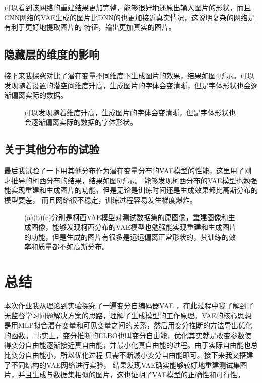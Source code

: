 \documentclass[UTF8]{ctexart}
\begin{document}
可以看到该网络的重建结果更加完整，能够很好地还原出输入图片的形状，而且CNN网络的VAE生成的图片比DNN的也更加接近真实情况，这说明复杂的网络是有利于更好地提取图片的
特征，输出更加真实的图片。
\subsection{隐藏层的维度的影响}
接下来我探究对比了潜在变量不同维度下生成图片的效果，结果如图4所示。可以发现随着设置的潜空间维度升高，生成图片的字体会变清晰，但是字体形状也会逐渐偏离实际的数据。
\begin{figure}[ht]
  \centering
  \quad
  \quad
  \quad
  \quad
  \quad
  \caption{可以发现随着维度升高，生成图片的字体会变清晰，但是字体形状也会逐渐偏离实际的数据的字体形状。}
\end{figure}
\subsection{关于其他分布的试验}
最后我试验了一下用其他分布作为潜在变量分布的VAE模型的性能，这里用了刚才推导的柯西分布的结果，结果如图5所示。
能够发现柯西分布的VAE模型也勉强能实现重建和生成图片的功能，但是无论是训练时间还是生成效果都比高斯分布的模型要差，
而且网络很不稳定，训练过程容易发生梯度爆炸。
\begin{figure}[h!]
  \centering
  \quad
  \quad
  \caption{(a)(b)(c)分别是柯西VAE模型对测试数据集的原图像，重建图像和生成图像，能够发现柯西分布的VAE模型也勉强能实现重建和生成图片的功能，但是生成的图片有很多是远远偏离正常形状的，其训练的效率和质量都不如高斯分布。}
\end{figure}
\section{总结}
本次作业我从理论到实验探究了一遍变分自编码器VAE
，在此过程中我了解到了无监督学习问题解决方案的思路，理解了生成模型的工作原理。VAE的核心思想是用MLP拟合潜在变量和可见变量之间的关系，然后用变分推断的方法导出优化的函数。
事实上，变分推断的ELBO也叫变分自由能，优化其实就是改变参数使得变分自由能逐渐接近真自由能，并最小化真自由能的过程。由于实际自由能也总比变分自由能小，所以优化过程
只需不断减小变分自由能即可\cite{1803.08823}。接下来我又搭建了不同结构的VAE网络进行实验，
结果发现VAE确实能够较好地重建测试集图片，并且生成与数据集相似的图片，这也证明了VAE模型的正确性和可行性。


\end{document}
